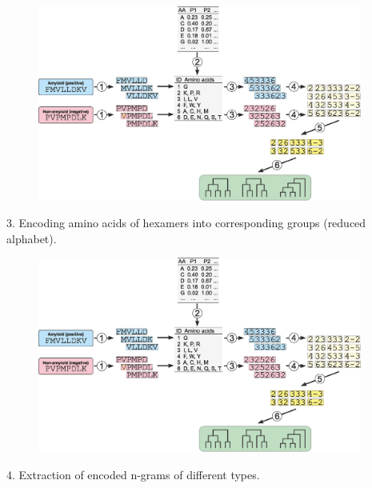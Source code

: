 \documentclass{beamer}\usepackage[]{graphicx}\usepackage[]{color}
\begin{document}
    \begin{frame}{}
\begin{figure} 
\includegraphics[width=0.95\textwidth]{static_figure/scheme.eps}
\end{figure}

3. Encoding amino acids of hexamers into corresponding groups (reduced alphabet). 
\end{frame}

    \begin{frame}{}
\begin{figure} 
\includegraphics[width=0.95\textwidth]{static_figure/scheme.eps}
\end{figure}

4. Extraction of encoded n-grams of different types.
\end{frame}
\end{document}
